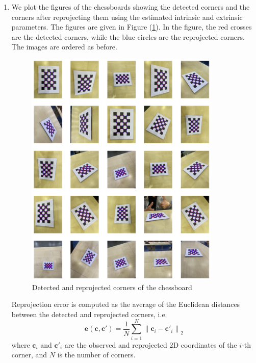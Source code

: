 \documentclass[10pt]{article}
\newcommand{\figref}[1]{Figure (\ref{fig:#1})}
\begin{document}
\begin{enumerate}
        \item We plot the figures of the chessboards showing the detected corners and the
        corners after reprojecting them using the estimated intrinsic and extrinsic parameters.
        The figures are given in \figref{corners}. In the figure, the red crosses are the
        detected corners, while the blue circles are the reprojected corners. The images are
        ordered as before.
        \begin{figure}[htbp]
            \begin{center}
                \includegraphics[width=0.875\textwidth]{Assets/Question-4/corners.png}
                \caption{Detected and reprojected corners of the chessboard}
                \label{fig:corners}
            \end{center}
        \end{figure}
        Reprojection error is computed as the average of the Euclidean distances between the
        detected and reprojected corners, i.e.
        \begin{equation*}
            \mathbf{e}(\mathbf{c}, \mathbf{c'}) =
            \frac{1}{N} \sum_{i=1}^{N} \left\| \mathbf{c}_{i} - \mathbf{c'}_{i} \right\|_{2}
        \end{equation*}
        where $\mathbf{c}_{i}$ and $\mathbf{c'}_{i}$ are the observed and reprojected
        2D coordinates of the $i$-th corner, and $N$ is the number of corners.


\end{enumerate}
\end{document}

